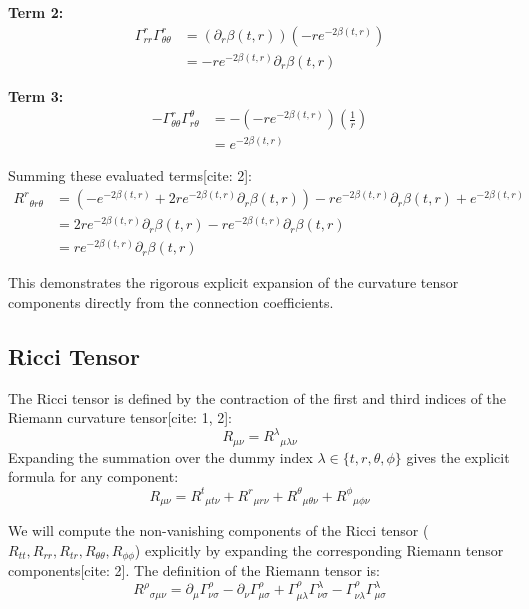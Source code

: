 \documentclass[11pt, a4paper]{report}
\begin{document}
\textbf{Term 2:}
\begin{align}
    \Gamma^r_{rr}\Gamma^r_{\theta\theta} &= (\partial_r \beta(t,r)) \left( -r e^{-2\beta(t,r)} \right) \nonumber \\
    &= -r e^{-2\beta(t,r)} \partial_r \beta(t,r)
\end{align}

\textbf{Term 3:}
\begin{align}
    -\Gamma^r_{\theta\theta}\Gamma^\theta_{r\theta} &= - \left( -r e^{-2\beta(t,r)} \right) \left( \frac{1}{r} \right) \nonumber \\
    &= e^{-2\beta(t,r)}
\end{align}

Summing these evaluated terms[cite: 2]:
\begin{align}
    {R^r}_{\theta r\theta} &= \left( -e^{-2\beta(t,r)} + 2r e^{-2\beta(t,r)} \partial_r \beta(t,r) \right) - r e^{-2\beta(t,r)} \partial_r \beta(t,r) + e^{-2\beta(t,r)} \nonumber \\
    &= 2r e^{-2\beta(t,r)} \partial_r \beta(t,r) - r e^{-2\beta(t,r)} \partial_r \beta(t,r) \nonumber \\
    &= r e^{-2\beta(t,r)} \partial_r \beta(t,r)
\end{align}

This demonstrates the rigorous explicit expansion of the curvature tensor components directly from the connection coefficients.




\subsection{Ricci Tensor}

The Ricci tensor is defined by the contraction of the first and third indices of the Riemann curvature tensor[cite: 1, 2]:
\begin{equation}
    R_{\mu\nu} = {R^\lambda}_{\mu\lambda\nu}
\end{equation}
Expanding the summation over the dummy index $\lambda \in \{t, r, \theta, \phi\}$ gives the explicit formula for any component:
\begin{equation}
    R_{\mu\nu} = {R^t}_{\mu t\nu} + {R^r}_{\mu r\nu} + {R^\theta}_{\mu \theta\nu} + {R^\phi}_{\mu \phi\nu} \label{eq:ricci_sum}
\end{equation}

We will compute the non-vanishing components of the Ricci tensor ($R_{tt}, R_{rr}, R_{tr}, R_{\theta\theta}, R_{\phi\phi}$) explicitly by expanding the corresponding Riemann tensor components[cite: 2]. The definition of the Riemann tensor is:
\begin{equation}
    {R^\rho}_{\sigma\mu\nu} = \partial_\mu \Gamma^\rho_{\nu\sigma} - \partial_\nu \Gamma^\rho_{\mu\sigma} + \Gamma^\rho_{\mu\lambda}\Gamma^\lambda_{\nu\sigma} - \Gamma^\rho_{\nu\lambda}\Gamma^\lambda_{\mu\sigma} \label{eq:riemann_def_ricci}
\end{equation}
\end{document}
